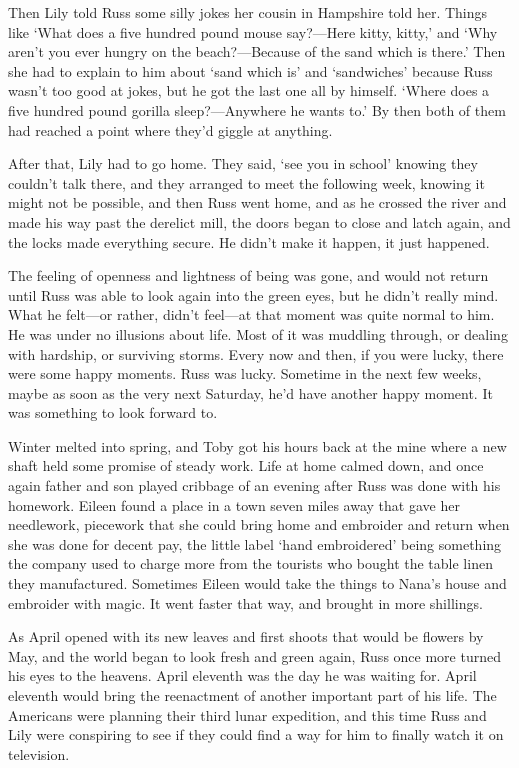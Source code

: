 Then Lily told Russ some silly jokes her cousin in Hampshire told her. Things like `What does a five hundred pound mouse say?—Here kitty, kitty,' and `Why aren't you ever hungry on the beach?—Because of the sand which is there.' Then she had to explain to him about `sand which is' and `sandwiches' because Russ wasn't too good at jokes, but he got the last one all by himself. `Where does a five hundred pound gorilla sleep?—Anywhere he wants to.' By then both of them had reached a point where they'd giggle at anything.

After that, Lily had to go home. They said, `see you in school' knowing they couldn't talk there, and they arranged to meet the following week, knowing it might not be possible, and then Russ went home, and as he crossed the river and made his way past the derelict mill, the doors began to close and latch again, and the locks made everything secure. He didn't make it happen, it just happened.

The feeling of openness and lightness of being was gone, and would not return until Russ was able to look again into the green eyes, but he didn't really mind. What he felt—or rather, didn't feel—at that moment was quite normal to him. He was under no illusions about life. Most of it was muddling through, or dealing with hardship, or surviving storms. Every now and then, if you were lucky, there were some happy moments. Russ was lucky. Sometime in the next few weeks, maybe as soon as the very next Saturday, he'd have another happy moment. It was something to look forward to.

Winter melted into spring, and Toby got his hours back at the mine where a new shaft held some promise of steady work. Life at home calmed down, and once again father and son played cribbage of an evening after Russ was done with his homework. Eileen found a place in a town seven miles away that gave her needlework, piecework that she could bring home and embroider and return when she was done for decent pay, the little label `hand embroidered' being something the company used to charge more from the tourists who bought the table linen they manufactured. Sometimes Eileen would take the things to Nana's house and embroider with magic. It went faster that way, and brought in more shillings.

As April opened with its new leaves and first shoots that would be flowers by May, and the world began to look fresh and green again, Russ once more turned his eyes to the heavens. April eleventh was the day he was waiting for. April eleventh would bring the reenactment of another important part of his life. The Americans were planning their third lunar expedition, and this time Russ and Lily were conspiring to see if they could find a way for him to finally watch it on television.

